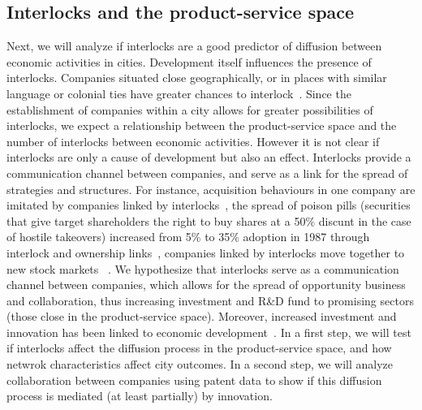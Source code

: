 \subsection{Interlocks and the product-service space}
\label{sec:interlockspss}
Next, we will analyze if interlocks are a good predictor of diffusion between economic activities in cities. 
Development itself influences the presence of interlocks.
Companies situated close geographically, or in places with similar language or colonial ties 
have greater chances to interlock~\citep{nobel2004economische}.
Since the establishment of companies within a city allows for greater possibilities of interlocks,
we expect a relationship between the product-service space and the number of interlocks between economic activities.
However it is not clear if interlocks are only a cause of development but also an effect.
Interlocks provide a communication channel between companies, 
and serve as a link for the spread of strategies and structures.
For instance, acquisition behaviours in one company are imitated by companies linked by interlocks~\citep{Haunschild1993},
the spread of poison pills (securities that give target shareholders the right to buy shares at a 50\% discunt in the case of hostile takeovers) increased from 5\% to 35\% adoption in 1987 through interlock and ownership links~\cite{Davis1997,Davis1991}, 
companies linked by interlocks move together to new stock markets ~\citep{Rao1999}.
We hypothesize that interlocks serve as a communication channel between companies,
which allows for the spread of opportunity business and collaboration,
thus increasing investment and R\&D fund to promising sectors (those close in the product-service space).
Moreover, increased investment and innovation has been linked to economic development~\citep{Romer1991,grossman1991,hidalgo2007}.
In a first step, we will test if interlocks affect the diffusion process in the product-service space,
and how netwrok characteristics affect city outcomes.
In a second step, we will analyze collaboration between companies using patent data to show if this diffusion process is mediated (at least partially) by innovation.

